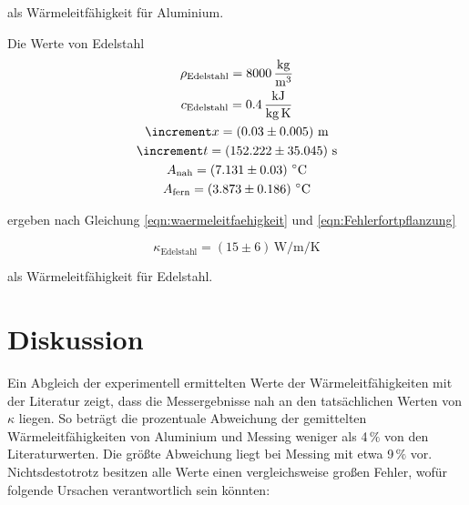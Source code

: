 als Wärmeleitfähigkeit für Aluminium.
\hfill \break

Die Werte von Edelstahl
\begin{gather*}
  \rho_\text{Edelstahl} = 8000\,\unit[per-mode=fraction]{\kilo\gram\per\cubic\meter} \\
  c_\text{Edelstahl} = 0.4\,\unit{\kilo\joule\per\kilo\gram\per\kelvin} \\
  \increment x = \left(0.03\pm0.005\right)\,\unit{\meter} \\
  \increment t = \left(152.222\pm35.045\right)\,\unit{\second} \\
  A_\text{nah} = \left(7.131\pm0.03\right)\,\unit{\celsius}\\
  A_\text{fern} = \left(3.873\pm0.186\right)\,\unit{\celsius}\\
\end{gather*}

ergeben nach Gleichung \eqref{eqn:waermeleitfaehigkeit} und \eqref{eqn:Fehlerfortpflanzung}

\begin{equation}
  \kappa_\text{Edelstahl} = \left(15\pm6\right)\,\unit{\watt\per\meter\per\kelvin}
\end{equation}

als Wärmeleitfähigkeit für Edelstahl.
\hfill \break

\section{Diskussion}
 
Ein Abgleich der experimentell ermittelten Werte der Wärmeleitfähigkeiten mit der Literatur zeigt, dass die Messergebnisse nah 
an den tatsächlichen Werten von $\kappa$ liegen. So beträgt die prozentuale Abweichung der gemittelten Wärmeleitfähigkeiten von 
Aluminium und Messing weniger als 4\,$\unit{\percent}$ von den Literaturwerten. Die größte Abweichung liegt bei Messing mit etwa
9\,$\unit{\percent}$ vor. Nichtsdestotrotz besitzen alle Werte einen vergleichsweise großen Fehler, wofür folgende Ursachen
verantwortlich sein könnten:\\\\

